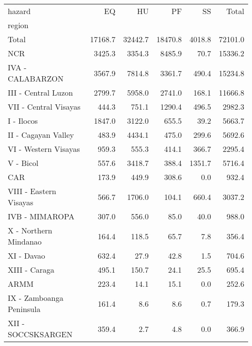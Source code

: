 \begin{tabular}{lrrrrr}
\toprule
hazard &       EQ &       HU &       PF &      SS &    Total \\
region                   &          &          &          &         &          \\
\midrule
Total                    &  17168.7 &  32442.7 &  18470.8 &  4018.8 &  72101.0 \\
NCR                      &   3425.3 &   3354.3 &   8485.9 &    70.7 &  15336.2 \\
IVA - CALABARZON         &   3567.9 &   7814.8 &   3361.7 &   490.4 &  15234.8 \\
III - Central Luzon      &   2799.7 &   5958.0 &   2741.0 &   168.1 &  11666.8 \\
VII - Central Visayas    &    444.3 &    751.1 &   1290.4 &   496.5 &   2982.3 \\
I - Ilocos               &   1847.0 &   3122.0 &    655.5 &    39.2 &   5663.7 \\
II - Cagayan Valley      &    483.9 &   4434.1 &    475.0 &   299.6 &   5692.6 \\
VI - Western Visayas     &    959.3 &    555.3 &    414.1 &   366.7 &   2295.4 \\
V - Bicol                &    557.6 &   3418.7 &    388.4 &  1351.7 &   5716.4 \\
CAR                      &    173.9 &    449.9 &    308.6 &     0.0 &    932.4 \\
VIII - Eastern Visayas   &    566.7 &   1706.0 &    104.1 &   660.4 &   3037.2 \\
IVB - MIMAROPA           &    307.0 &    556.0 &     85.0 &    40.0 &    988.0 \\
X - Northern Mindanao    &    164.4 &    118.5 &     65.7 &     7.8 &    356.4 \\
XI - Davao               &    632.4 &     27.9 &     42.8 &     1.5 &    704.6 \\
XIII - Caraga            &    495.1 &    150.7 &     24.1 &    25.5 &    695.4 \\
ARMM                     &    223.4 &     14.1 &     15.1 &     0.0 &    252.6 \\
IX - Zamboanga Peninsula &    161.4 &      8.6 &      8.6 &     0.7 &    179.3 \\
XII - SOCCSKSARGEN       &    359.4 &      2.7 &      4.8 &     0.0 &    366.9 \\
\bottomrule
\end{tabular}
